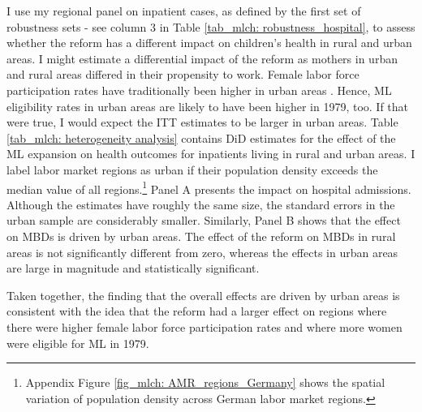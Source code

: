 I use my regional panel on inpatient cases, as defined by the first set of robustness sets - see column 3 in Table \ref{tab_mlch: robustness_hospital}, to assess whether the reform has a different impact on children's health in rural and urban areas. I might estimate a differential impact of the reform as mothers in urban and rural areas differed in their propensity to work. Female labor force participation rates have traditionally been higher in urban areas \citep{bender1993regionale}. Hence, ML eligibility rates in urban areas are likely to have been higher in 1979, too. If that were true, I would expect the ITT estimates to be larger in urban areas. Table \ref{tab_mlch: heterogeneity analysis} contains DiD estimates for the effect of the ML expansion on health outcomes for inpatients living in rural and urban areas. I label labor market regions as urban if their population density exceeds the median value of all regions.\footnote{Appendix Figure \ref{fig_mlch: AMR_regions_Germany} shows the spatial variation of population density across German labor market regions.} Panel A presents the impact on hospital admissions. Although the estimates have roughly the same size, the standard errors in the urban sample are considerably smaller. Similarly, Panel B shows that the effect on MBDs is driven by urban areas. The effect of the reform on MBDs in rural areas is not significantly different from zero, whereas the effects in urban areas are large in magnitude and statistically significant.

Taken together, the finding that the overall effects are driven by urban areas is consistent with the idea that the reform had a larger effect on regions where there were higher female labor force participation rates and where more women were eligible for ML in 1979.





